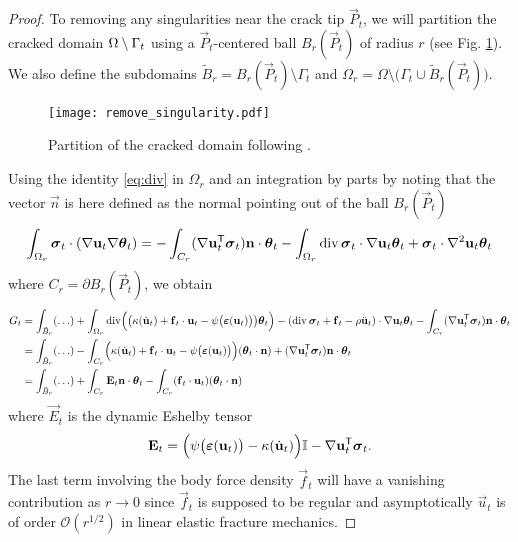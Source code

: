 \begin{proof}
To removing any singularities near the crack tip $\vec{P}_t$, we will partition the cracked domain ${\Omega\setminus\Gamma_t}$ using a $\vec{P}_t$-centered ball $B_r(\vec{P}_t)$ of radius $r$ (see Fig. \ref{fig:partition}). We also define the subdomains $\tilde{B}_r=B_r(\vec{P}_t)\setminus\Gamma_t$ and $\Omega_r=\Omega\setminus\bigl(\Gamma_t\cup\tilde{B}_r(\vec{P}_t)\bigr)$.
\begin{figure}[htbp]
\centering
\texttt{[image: remove\_singularity.pdf]}
\caption{Partition of the cracked domain following \cite{SicsicMarigo:2013}.} \label{fig:partition}
\end{figure}

Using the identity \eqref{eq:div} in $\Omega_r$ and an integration by parts by noting that the vector $\vec{n}$ is here defined as the normal pointing out of the ball $B_r(\vec{P}_t)$
\begin{equation} \label{eq:signunt}
\int_{\Omega_r}\sig_t\cdot(\nabla\vec{u}_t\nabla\vtheta_t)=-\int_{C_r}(\nabla\vec{u}_t^\mT\sig_t)\vec{n}\cdot\vtheta_t-\int_{\Omega_r}\div\sig_t\cdot\nabla\vec{u}_t\vtheta_t+\sig_t\cdot\nabla^2\vec{u}_t\vtheta_t
\end{equation}
where $C_r=\partial B_r(\vec{P}_t)$, we obtain
\begin{align*}
G_t &= \int_{\tilde{B}_r}(\ldots)+\int_{\Omega_r}\div\Bigl(\bigl(\kappa(\dot{\vec{u}}_t)+\vec{f}_t\cdot\vec{u}_t-\psi\bigl(\eps(\vec{u}_t)\bigr)\bigr)\vtheta_t\Bigr)-(\div\sig_t+\vec{f}_t-\rho\ddot{\vec{u}}_t)\cdot\nabla\vec{u}_t\vtheta_t-\int_{C_r}(\nabla\vec{u}_t^\mT\sig_t)\vec{n}\cdot\vtheta_t \\
&= \int_{\tilde{B}_r}(\ldots)-\int_{C_r}\Bigl(\kappa(\dot{\vec{u}}_t)+\vec{f}_t\cdot\vec{u}_t-\psi\bigl(\eps(\vec{u}_t)\bigr)\Bigr)(\vtheta_t\cdot\vec{n})+(\nabla\vec{u}_t^\mT\sig_t)\vec{n}\cdot\vtheta_t \\
&= \int_{\tilde{B}_r}(\ldots)+\int_{C_r}\vec{E}_t\vec{n}\cdot\vtheta_t-\int_{C_r}(\vec{f}_t\cdot\vec{u}_t)(\vtheta_t\cdot\vec{n})
\end{align*}
where $\vec{E}_t$ is the dynamic Eshelby tensor \cite{Maugin:1994}
\begin{equation} \label{eq:Eshelby}
\vec{E}_t=\Bigl(\psi\bigl(\eps(\vec{u}_t)\bigr)-\kappa(\dot{\vec{u}}_t)\Bigr)\mathbb{I}-\nabla\vec{u}_t^\mT\sig_t.
\end{equation}
The last term involving the body force density $\vec{f}_t$ will have a vanishing contribution as $r\to 0$ since $\vec{f}_t$ is supposed to be regular and asymptotically $\vec{u}_t$ is of order $\mathcal{O}(r^{1/2})$ in linear elastic fracture mechanics.


\end{proof}
